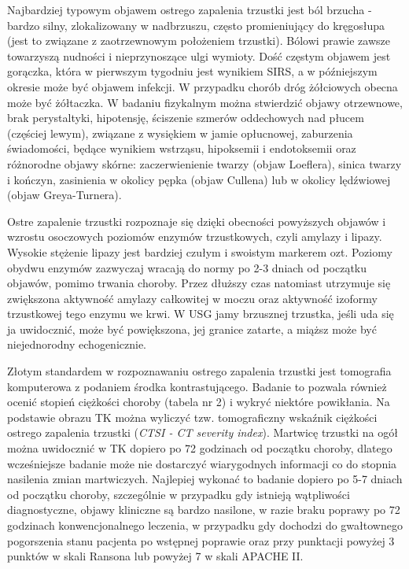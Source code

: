 \documentclass[a4paper, 12pt]{report}
\begin{document}
Najbardziej typowym objawem ostrego zapalenia trzustki jest ból
brzucha - bardzo silny, zlokalizowany w nadbrzuszu, często
promieniujący do kręgosłupa (jest to związane z zaotrzewnowym
położeniem trzustki). Bólowi prawie zawsze towarzyszą nudności i
nieprzynoszące ulgi wymioty. Dość częstym objawem jest gorączka, która
w pierwszym tygodniu jest wynikiem SIRS, a w późniejszym okresie może
być objawem infekcji. W przypadku chorób dróg żółciowych obecna może
być żółtaczka. W badaniu fizykalnym można stwierdzić objawy
otrzewnowe, brak perystaltyki, hipotensję, ściszenie szmerów oddechowych nad płucem
(częściej lewym), związane z wysiękiem w jamie opłucnowej, zaburzenia
świadomości, będące wynikiem wstrząsu, hipoksemii i endotoksemii 
oraz różnorodne objawy skórne: zaczerwienienie twarzy (objaw
Loeflera), sinica twarzy i kończyn, zasinienia w okolicy pępka (objaw
Cullena) lub w okolicy lędźwiowej (objaw Greya-Turnera).

Ostre zapalenie trzustki rozpoznaje się dzięki obecności powyższych
objawów i wzrostu osoczowych poziomów enzymów trzustkowych, czyli amylazy i
lipazy. Wysokie stężenie lipazy jest bardziej czułym i swoistym
markerem ozt. Poziomy obydwu enzymów zazwyczaj wracają do normy po 2-3
dniach od początku objawów, pomimo trwania choroby. Przez dłuższy czas
natomiast utrzymuje się zwiększona aktywność amylazy całkowitej w moczu oraz
aktywność izoformy trzustkowej tego enzymu we krwi. W USG jamy
brzusznej trzustka, jeśli uda się ja uwidocznić, może być powiększona,
jej granice zatarte, a miąższ może być niejednorodny echogenicznie.

Złotym standardem w rozpoznawaniu ostrego zapalenia trzustki jest
tomografia komputerowa z podaniem środka kontrastującego. Badanie to
pozwala również ocenić stopień ciężkości choroby (tabela nr 2) i
wykryć niektóre powikłania. Na podstawie obrazu TK można wyliczyć
tzw. tomograficzny wskaźnik ciężkości ostrego zapalenia
trzustki (\textsl{CTSI - CT severity index}). Martwicę trzustki na ogół można
uwidocznić w TK dopiero po 72 godzinach od początku choroby, dlatego
wcześniejsze badanie może nie dostarczyć wiarygodnych informacji co do
stopnia nasilenia zmian martwiczych. Najlepiej wykonać to
badanie dopiero po 5-7 dniach od początku choroby, szczególnie w
przypadku gdy istnieją wątpliwości diagnostyczne, objawy kliniczne są
bardzo nasilone, w razie braku poprawy po 72 godzinach
konwencjonalnego leczenia, w przypadku gdy dochodzi do gwałtownego pogorszenia stanu
pacjenta po wstępnej poprawie oraz przy punktacji powyżej 3 punktów w
skali Ransona lub powyżej 7 w skali APACHE II.
\end{document}
